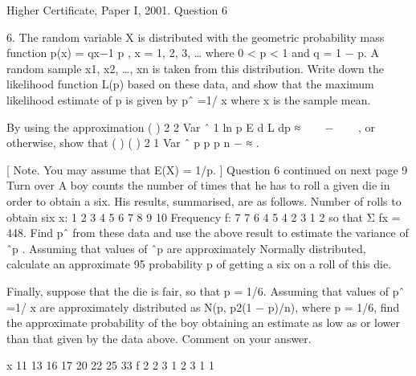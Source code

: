 \documentclass[a4paper,12pt]{article}
\begin{document}
Higher Certificate, Paper I, 2001. Question 6

\begin{framed}
6. The random variable X is distributed with the geometric probability mass function
p(x) = qx−1 p , x = 1, 2, 3, …
where 0 < p < 1 and q = 1 − p. A random sample x1, x2, …, xn is taken from this
distribution.
Write down the likelihood function L(p) based on these data, and show that the
maximum likelihood estimate of p is given by
pˆ =1/ x
where x is the sample mean.

By using the approximation
( ) 2
2
Var ˆ 1
ln
p
E d L
dp
≈
 
 − 
 
,
or otherwise, show that
( ) ( ) 2 1
Var ˆ
p p
p
n
−
≈ .

[ Note. You may assume that E(X) = 1/p. ]
Question 6 continued on next page
9
Turn over
A boy counts the number of times that he has to roll a given die in order to obtain
a six. His results, summarised, are as follows.
Number of rolls
to obtain six
x: 1 2 3 4 5 6 7 8 9 10
Frequency f: 7 7 6 4 5 4 2 3 1 2
so that Σ fx = 448. Find pˆ from these data and use the above result to estimate
the variance of ˆp . Assuming that values of ˆp are approximately Normally
distributed, calculate an approximate 95%
probability p of getting a six on a roll of this die.

Finally, suppose that the die is fair, so that p = 1/6. Assuming that values of
pˆ =1/ x are approximately distributed as N(p, p2(1 − p)/n), where p = 1/6, find
the approximate probability of the boy obtaining an estimate as low as or lower
than that given by the data above.
Comment on your answer.

x 11 13 16 17 20 22 25 33
f 2 2 3 1 2 3 1 1

\end{framed}
\end{document}
